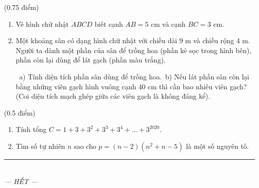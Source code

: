 \documentclass[12pt,a4paper]{article}
\begin{document}
\begin{ex} (0.75 điểm)
\begin{enumerate}[label=\textbf{\alph*)}, leftmargin=0.8cm, itemsep=2pt]
\item[\textbf{1)}] Vẽ hình chữ nhật $ABCD$ biết cạnh $AB = 5\text{ cm}$ và cạnh $BC = 3\text{ cm}$.
\item[\textbf{2)}] Một khoảng sân có dạng hình chữ nhật với chiều dài $9\text{ m}$ và chiều rộng $4\text{ m}$. Người ta dành một phần của sân để trồng hoa (phần kẻ sọc trong hình bên), phần còn lại dùng để lát gạch (phần màu trắng).\
\begin{center}
\end{center}\
a) Tính diện tích phần sân dùng để trồng hoa.\
b) Nếu lát phần sân còn lại bằng những viên gạch hình vuông cạnh $40\text{ cm}$ thì cần bao nhiêu viên gạch? (Coi diện tích mạch ghép giữa các viên gạch là không đáng kể).
\end{enumerate}
\end{ex}
\vspace{1.5mm}

\begin{ex} (0.5 điểm)
\begin{enumerate}[label=\textbf{\alph*)}, leftmargin=0.8cm, itemsep=2pt]
\item Tính tổng $C = 1 + 3 + 3^2 + 3^3 + 3^4 + \dots + 3^{2020}$.
\item Tìm số tự nhiên $n$ sao cho $p = (n - 2)(n^2 + n - 5)$ là một số nguyên tố.
\end{enumerate}
\end{ex}
\vspace{1.5mm}


\begin{center}
\rule{4cm}{0.4pt}\\
\textit{--- HẾT ---}
\end{center}
\end{document}
